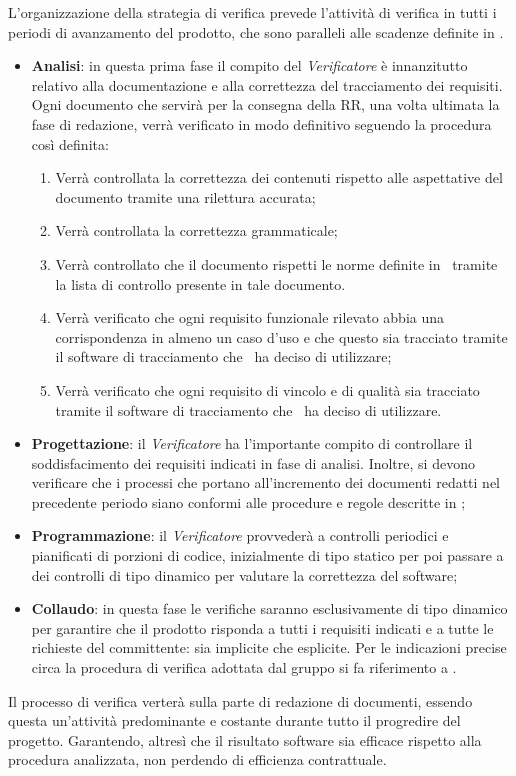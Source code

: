 L'organizzazione della strategia di verifica prevede l'attività di verifica in tutti i periodi di avanzamento del prodotto, che sono paralleli alle scadenze definite in \infoPDP.
\begin{itemize}
\item \textbf{Analisi}: in questa prima fase il compito del \textit{Verificatore} è innanzitutto relativo alla documentazione e alla correttezza del tracciamento dei requisiti. Ogni documento che servirà per la consegna della RR, una volta ultimata la fase di redazione, verrà verificato in modo definitivo seguendo la procedura così definita:
\begin{enumerate}
\item Verrà controllata la correttezza dei contenuti rispetto alle aspettative del documento tramite una rilettura accurata;
\item Verrà controllata la correttezza grammaticale;
\item Verrà controllato che il documento rispetti le norme definite in \infoNDP ~tramite la lista di controllo presente in tale documento.
\item Verrà verificato che ogni requisito funzionale rilevato abbia una corrispondenza in almeno un caso d'uso e che questo sia tracciato tramite il software di tracciamento che \gruppo ~ha deciso di utilizzare;
\item Verrà verificato che ogni requisito di vincolo e di qualità sia tracciato tramite il software di tracciamento che \gruppo ~ha deciso di utilizzare.
\end{enumerate}
\item \textbf{Progettazione}: il \textit{Verificatore} ha l'importante compito di controllare il soddisfacimento dei requisiti indicati in fase di analisi. Inoltre, si devono verificare che i processi che portano all'incremento dei documenti redatti nel precedente periodo siano conformi alle procedure e regole descritte in \infoNDP;
\item \textbf{Programmazione}: il \textit{Verificatore} provvederà a controlli periodici e pianificati di porzioni di codice, inizialmente di tipo statico per poi passare a dei controlli di tipo dinamico per valutare la correttezza del software;				
\item \textbf{Collaudo}: in questa fase le verifiche saranno esclusivamente di tipo dinamico per garantire che il prodotto risponda a tutti i requisiti indicati e a tutte le richieste del committente: sia implicite che esplicite.
Per le indicazioni precise circa la procedura di verifica adottata dal gruppo si fa riferimento a \infoNDP.
\end{itemize}
Il processo di verifica verterà sulla parte di redazione di documenti, essendo questa un'attività predominante e costante durante tutto il progredire del progetto. Garantendo, altresì che il risultato software sia efficace rispetto alla procedura analizzata, non perdendo di efficienza contrattuale. \\
